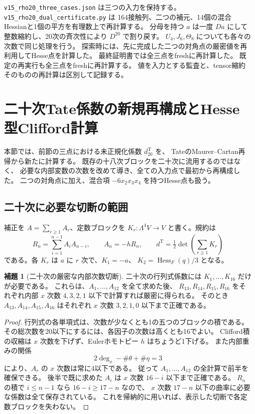 \documentclass[a4paper,11pt]{ltjsarticle}
\theoremstyle{definition}
\newtheorem{lemma}[theorem]{補題}
\begin{document}
\texttt{v15\_rho20\_three\_cases.json} は三つの入力を保持する。
\nolinkurl{v15_rho20_dual_certificate.py} は
164接触列、二つの補元、14個の混合Hessianと1個の平方を有理数上で再計算する。
分母を持つ $a$ は一度 $Da$ にして整数縮約し、20次の斉次性により $D^{20}$ で割り戻す。
$U_4,J_6,\Theta_8$ についても各々の次数で同じ処理を行う。
探索時には、先に完成した二つの対角点の厳密値を再利用してHesse点を計算した。
最終証明書では全三点をfreshに再計算した。
既定の再実行も全三点をfreshに再計算する。
値を入力とする監査と、tensor縮約そのものの再計算は区別して記録する。



\section{二十次Tate係数の新規再構成とHesse型Clifford計算}
\label{sec:v15-tate-twentieth}

本節では、前節の三点における未正規化係数 $d_{20}^{\mathrm T}$ を、
TateのMaurer--Cartan再帰から新たに計算する。
既存の十八次ブロックを二十次に流用するのではなく、
必要な内部変数の次数を改めて導き、全ての入力点で最初から再構成した。
二つの対角点に加え、混合項 $-6x_2x_3x_4$ を持つHesse点も扱う。

\subsection{二十次に必要な切断の範囲}

補正を $A=\sum_{r\ge1}A_r$、定数ブロックを
$K_r:\Lambda^4V\to V$ と書く。規約は
\[
 R_n=\sum_{i=1}^{n-1}A_iA_{n-i},\qquad A_n=-hR_n,
 \qquad d^{\mathrm T}=\tfrac12\det\!\left(\sum_{r\ge1}K_r\right)
\]
である。各 $K_r$ は $a$ に $r$ 次で、$K_1=-a$、
$K_2=\operatorname{Hess}_F(q)/3$ となる。

\begin{lemma}[二十次の厳密な内部次数切断]
\label{lem:v15-tate-twentieth-truncation}
二十次の行列式係数には $K_1,\ldots,K_{16}$ だけが必要である。
これらは、$A_1,\ldots,A_{12}$ を全て求めた後、
$R_{13},R_{14},R_{15},R_{16}$ をそれぞれ内部 $x$ 次数
$4,3,2,1$ 以下で計算すれば厳密に得られる。
そのとき $A_{13},A_{14},A_{15},A_{16}$ はそれぞれ
$x$ 次数 $3,2,1,0$ 以下まで正確である。
\end{lemma}

\begin{proof}
行列式の各単項式は、次数が少なくとも1の五つのブロックの積である。
その総次数を20以下にするには、各因子の次数は高くとも16でよい。
Clifford積の収縮は $x$ 次数を下げず、Eulerホモトピー $h$ はちょうど1下げる。
また内部重みの関係
\[
 2\deg_x-\#\theta+\#\eta=3
\]
により、$A_r$ の $x$ 次数は常に4以下である。
従って $A_1,\ldots,A_{12}$ の全計算で前半を確保できる。
後半で既に求めた $A_i$ は $x$ 次数 $16-i$ 以下まで正確である。
$R_n$ の積で $i\le n-1$ なら $16-i\ge17-n$ なので、
$x$ 次数 $17-n$ 以下の曲率に必要な係数は全て保存されている。
これを帰納的に用いれば、表示した切断で各定数ブロックを失わない。
\end{proof}
\end{document}
